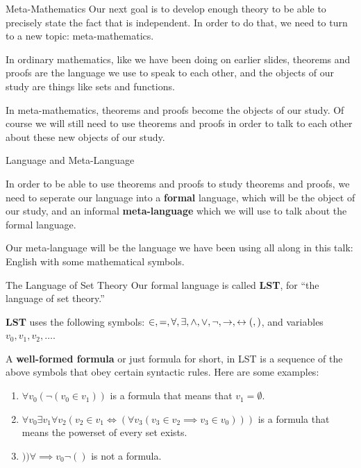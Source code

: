 \documentclass[pdf,final]{prosper}
\newcommand{\skipsmall}{\vspace{1em}}
\newcommand{\skipmed}{\vspace{2em}}
\begin{document}
\begin{slide}{Meta-Mathematics}
Our next goal is to develop enough theory to be able to precisely state the fact
that \CH is independent. In order to do that, we need to turn to a new topic:
meta-mathematics. 

\skipsmall

In ordinary mathematics, like we have been doing on earlier slides, theorems and
proofs are the language we use to speak to each other, and the objects of our
study are things like sets and functions. 

\skipsmall

In meta-mathematics, theorems and
proofs become the objects of our study. Of course we will still need to use
theorems and proofs in order to talk to each other about these new objects of
our study.

\end{slide}

\begin{slide}{Language and Meta-Language}

In order to be able to use theorems and proofs to study theorems and
proofs, we need to seperate our language into a \textbf{formal} language, which
will be the object of our study, and an informal \textbf{meta-language} which we will use to
talk about the formal language.

\skipmed

Our meta-language will be the language we have been using all along in this
talk:  English with some mathematical symbols.

\end{slide}

\begin{slide}{The Language of Set Theory}
Our formal language is called \textbf{LST}, for ``the language of set theory.''

\skipsmall

\textbf{LST} uses the following symbols: $\in, =,\forall, \exists, \wedge,\vee,\neg, \rightarrow,\leftrightarrow
(, )$, and variables $v_0,v_1,v_2,\dots$.

\skipsmall

A \textbf{well-formed formula} or just formula for short, in LST is a
sequence of
the above symbols that obey certain syntactic rules. Here are some examples:

\begin{enumerate}
  \item $\forall v_0(\neg(v_0\in v_1))$ is a formula that means that
  $v_1=\emptyset$. 
  \item $\forall v_0 \exists v_1 \forall v_2 (v_2\in v_1 \iff (\forall
  v_3(v_3\in v_2\implies v_3\in v_0)))$ is a formula that means the powerset of
  every set exists.
  \item $))\forall\implies v_0\neg()$ is not a formula.
\end{enumerate}

\end{slide}
\end{document}
